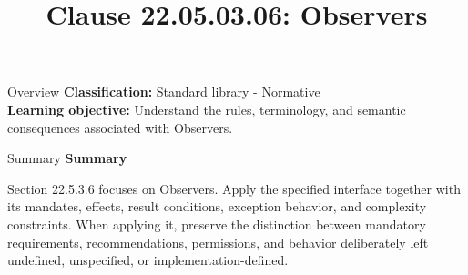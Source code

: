 \documentclass[10pt,letterpaper]{article}
\title{Clause 22.05.03.06: Observers}
\author{}
\date{}
\begin{document}
\maketitle
\begin{CornellOverviewBox}{Overview}
\textbf{Classification:} Standard library - Normative\\[2pt]
\textbf{Learning objective:} Understand the rules, terminology, and semantic consequences associated with Observers.
\end{CornellOverviewBox}\begin{CornellSummaryBox}{Summary}
{\sffamily\bfseries\color{Accent} Summary}\par\vspace{3pt}Section 22.5.3.6 focuses on Observers. Apply the specified interface together with its mandates, effects, result conditions, exception behavior, and complexity constraints. When applying it, preserve the distinction between mandatory requirements, recommendations, permissions, and behavior deliberately left undefined, unspecified, or implementation-defined.
\end{CornellSummaryBox}
\end{document}
